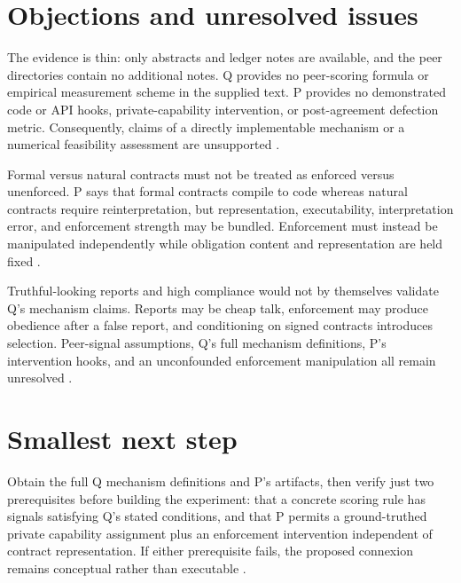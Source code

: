 \documentclass{article}
\begin{document}
\section{Objections and unresolved issues}

The evidence is thin: only abstracts and ledger notes are available, and the peer directories contain no additional notes.  Q provides no peer-scoring formula or empirical measurement scheme in the supplied text.  P provides no demonstrated code or API hooks, private-capability intervention, or post-agreement defection metric.  Consequently, claims of a directly implementable mechanism or a numerical feasibility assessment are unsupported .

Formal versus natural contracts must not be treated as enforced versus unenforced.  P says that formal contracts compile to code whereas natural contracts require reinterpretation, but representation, executability, interpretation error, and enforcement strength may be bundled.  Enforcement must instead be manipulated independently while obligation content and representation are held fixed .

Truthful-looking reports and high compliance would not by themselves validate Q's mechanism claims.  Reports may be cheap talk, enforcement may produce obedience after a false report, and conditioning on signed contracts introduces selection.  Peer-signal assumptions, Q's full mechanism definitions, P's intervention hooks, and an unconfounded enforcement manipulation all remain unresolved .

\section{Smallest next step}

Obtain the full Q mechanism definitions and P's artifacts, then verify just two prerequisites before building the experiment: that a concrete scoring rule has signals satisfying Q's stated conditions, and that P permits a ground-truthed private capability assignment plus an enforcement intervention independent of contract representation.  If either prerequisite fails, the proposed connexion remains conceptual rather than executable .
\end{document}
